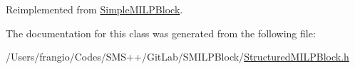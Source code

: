 Reimplemented from \mbox{\hyperlink{class_s_m_spp__di__unipi__it_1_1_simple_m_i_l_p_block_aefb3f33afdab2b6f4aef3f926c10df51}{Simple\+M\+I\+L\+P\+Block}}.



The documentation for this class was generated from the following file\+:\begin{DoxyCompactItemize}
\item 
/\+Users/frangio/\+Codes/\+S\+M\+S++/\+Git\+Lab/\+S\+M\+I\+L\+P\+Block/\mbox{\hyperlink{_structured_m_i_l_p_block_8h}{Structured\+M\+I\+L\+P\+Block.\+h}}\end{DoxyCompactItemize}
